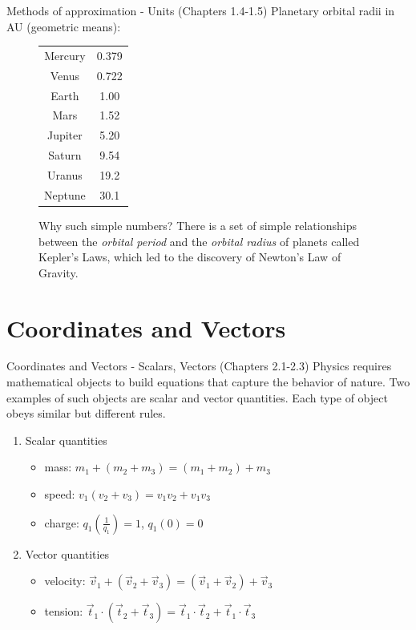 \documentclass{beamer}
\begin{document}
\begin{frame}{Methods of approximation - Units (Chapters 1.4-1.5)}
Planetary orbital radii in \alert{AU} (geometric means):
\begin{figure}
\begin{tabular}{| c | c |}
\hline
Mercury & 0.379 \\
Venus & 0.722 \\
Earth & 1.00 \\
Mars & 1.52 \\
Jupiter & 5.20 \\
Saturn & 9.54 \\
Uranus & 19.2 \\
Neptune & 30.1 \\
\hline
\end{tabular}
\caption{\label{tab:planets} Why such simple numbers?  There is a set of simple relationships between the \textit{orbital period} and the \textit{orbital radius} of planets called Kepler's Laws, which led to the discovery of \alert{Newton's Law of Gravity.}}
\end{figure}
\end{frame}

\section{Coordinates and Vectors}

\begin{frame}{Coordinates and Vectors - Scalars, Vectors (Chapters 2.1-2.3)}
Physics requires \alert{mathematical objects} to build equations that capture the behavior of nature.  Two examples of such objects are \alert{scalar} and \alert{vector} quantities.  Each type of object obeys similar but different rules.
\begin{enumerate}
\item Scalar quantities
\begin{itemize}
\item mass: $m_1+(m_2+m_3) = (m_1+m_2)+m_3$
\item speed: $v_1(v_2+v_3) = v_1v_2+v_1v_3$
\item charge: $q_1 \left(\frac{1}{q_1}\right) = 1$, $q_1(0) = 0$
\end{itemize}
\item Vector quantities
\begin{itemize}
\item velocity: $\vec{v}_1 + (\vec{v}_2+\vec{v}_3) = (\vec{v}_1 + \vec{v}_2)+\vec{v}_3$
\item tension: $\vec{t}_1 \cdot (\vec{t}_2 + \vec{t}_3) = \vec{t}_1 \cdot \vec{t}_2 + \vec{t}_1 \cdot \vec{t}_3$
\end{itemize}
\end{enumerate}
\end{frame}
\end{document}
